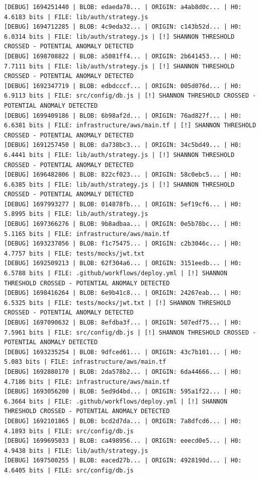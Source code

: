 \documentclass[12pt, a4paper, oneside]{report}
\begin{document}
\begin{lstlisting}[basicstyle=\tiny\ttfamily]
[DEBUG] 1694251440 | BLOB: edaeda78... | ORIGIN: a4ab8d0c... | H0: 4.6183 bits | FILE: lib/auth/strategy.js
[DEBUG] 1694712285 | BLOB: 4c9eda32... | ORIGIN: c143b52d... | H0: 6.0314 bits | FILE: lib/auth/strategy.js | [!] SHANNON THRESHOLD CROSSED - POTENTIAL ANOMALY DETECTED
[DEBUG] 1698708822 | BLOB: a5081ff4... | ORIGIN: 2b641453... | H0: 7.7111 bits | FILE: lib/auth/strategy.js | [!] SHANNON THRESHOLD CROSSED - POTENTIAL ANOMALY DETECTED
[DEBUG] 1692347719 | BLOB: edbdcccf... | ORIGIN: 005d076d... | H0: 6.9113 bits | FILE: src/config/db.js | [!] SHANNON THRESHOLD CROSSED - POTENTIAL ANOMALY DETECTED
[DEBUG] 1699409186 | BLOB: 6b98af2d... | ORIGIN: 76ad827f... | H0: 6.6381 bits | FILE: infrastructure/aws/main.tf | [!] SHANNON THRESHOLD CROSSED - POTENTIAL ANOMALY DETECTED
[DEBUG] 1691257450 | BLOB: da738bc3... | ORIGIN: 34c5bd49... | H0: 6.4441 bits | FILE: lib/auth/strategy.js | [!] SHANNON THRESHOLD CROSSED - POTENTIAL ANOMALY DETECTED
[DEBUG] 1696482806 | BLOB: 822cf023... | ORIGIN: 58c0ebc5... | H0: 6.6385 bits | FILE: lib/auth/strategy.js | [!] SHANNON THRESHOLD CROSSED - POTENTIAL ANOMALY DETECTED
[DEBUG] 1697993277 | BLOB: 014878fb... | ORIGIN: 5ef19cf6... | H0: 5.8995 bits | FILE: lib/auth/strategy.js
[DEBUG] 1697366276 | BLOB: 9b8adbaa... | ORIGIN: 0e5b78bc... | H0: 5.1165 bits | FILE: infrastructure/aws/main.tf
[DEBUG] 1693237056 | BLOB: f1c75475... | ORIGIN: c2b3046c... | H0: 4.7757 bits | FILE: tests/mocks/jwt.txt
[DEBUG] 1692509213 | BLOB: 62f304a6... | ORIGIN: 3151eedb... | H0: 6.5788 bits | FILE: .github/workflows/deploy.yml | [!] SHANNON THRESHOLD CROSSED - POTENTIAL ANOMALY DETECTED
[DEBUG] 1698416264 | BLOB: 6e9b41c8... | ORIGIN: 24267eab... | H0: 6.5325 bits | FILE: tests/mocks/jwt.txt | [!] SHANNON THRESHOLD CROSSED - POTENTIAL ANOMALY DETECTED
[DEBUG] 1697090632 | BLOB: 8efdba3f... | ORIGIN: 507edf75... | H0: 7.5961 bits | FILE: src/config/db.js | [!] SHANNON THRESHOLD CROSSED - POTENTIAL ANOMALY DETECTED
[DEBUG] 1693235254 | BLOB: 9dfced61... | ORIGIN: 43c7b101... | H0: 5.083 bits | FILE: infrastructure/aws/main.tf
[DEBUG] 1692880170 | BLOB: 2da578b2... | ORIGIN: 6da44666... | H0: 4.7186 bits | FILE: infrastructure/aws/main.tf
[DEBUG] 1693056200 | BLOB: 5ed9d4bd... | ORIGIN: 595a1f22... | H0: 6.3664 bits | FILE: .github/workflows/deploy.yml | [!] SHANNON THRESHOLD CROSSED - POTENTIAL ANOMALY DETECTED
[DEBUG] 1692101865 | BLOB: bcd2d7da... | ORIGIN: 7a8dfcd6... | H0: 4.1893 bits | FILE: src/config/db.js
[DEBUG] 1699695033 | BLOB: ca498956... | ORIGIN: eeecd0e5... | H0: 4.9438 bits | FILE: lib/auth/strategy.js
[DEBUG] 1697500255 | BLOB: eaced27b... | ORIGIN: 4928190d... | H0: 4.6405 bits | FILE: src/config/db.js

\end{lstlisting}
\end{document}
